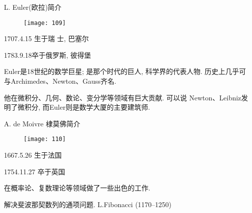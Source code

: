 \documentclass{beamer}
\begin{document}
\begin{frame}{L. Euler(欧拉)简介}

\begin{minipage}[t]{0.3\linewidth}
\begin{figure}\vspace{-3mm}
\texttt{[image: 109]}
\end{figure}
\end{minipage}\qquad
\begin{minipage}[t]{0.6\linewidth}
1707.4.15 生于瑞  士, 巴塞尔

1783.9.18卒于俄罗斯, 彼得堡
\bigskip

Euler是18世纪的数学巨星; 是那个时代的巨人, 科学界的代表人物. 历史上几乎可与Archimedes、Newton、Gauss齐名. 
\end{minipage}
\bigskip

他在微积分、几何、数论、变分学等领域有巨大贡献. 可以说 Newton、Leibniz发明了微积分, 而Euler则是数学大厦的主要建筑师. 

\end{frame}
\begin{frame}{A. de Moivre 棣莫佛简介}

\begin{minipage}[t]{0.3\linewidth}
	\begin{figure}\vspace{-3mm}
		\texttt{[image: 110]}
	\end{figure}
\end{minipage}\qquad
\begin{minipage}[t]{0.6\linewidth}
1667.5.26 生于法国

1754.11.27 卒于英国
\bigskip

在概率论、复数理论等领域做了一些出色的工作. 
\bigskip

解决斐波那契数列的通项问题. L.Fibonacci (1170--1250)
\end{minipage}


\end{frame}


\end{document}
